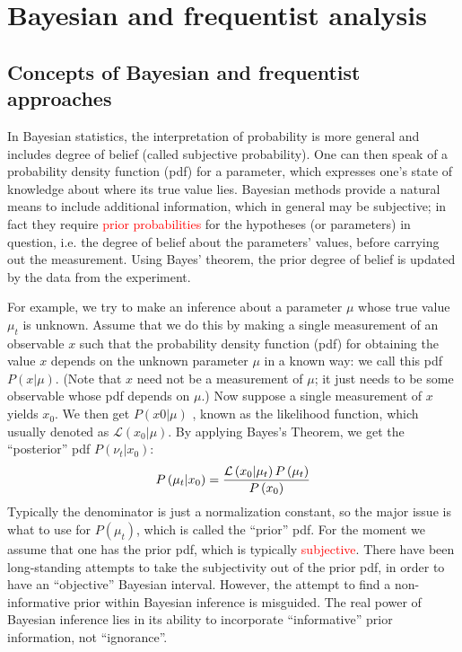 \documentclass[a4paper,12pt]{article}
\begin{document}
\section{Bayesian and frequentist analysis}
\subsection{Concepts of Bayesian and frequentist approaches}
In Bayesian statistics, the interpretation of probability is more
general and includes degree of belief (called subjective probability). One can then speak of a probability density function (pdf)
for a parameter, which expresses one’s state of knowledge about
where its true value lies. Bayesian methods provide a natural
means to include additional information, which in general may be
subjective; in fact they require \textcolor{red}{prior probabilities} for the hypotheses (or parameters) in question, i.e. the degree of belief about the
parameters’ values, before carrying out the measurement. Using
Bayes’ theorem, the prior degree of belief is updated by the data from the experiment.

For example, we try to make an inference about a parameter $\mu$ whose true value $\mu_t$ is unknown. Assume that we do this by making a single measurement of an observable $x$ such that the probability density function (pdf) for obtaining the value $x$ depends on the
unknown parameter $\mu$ in a known way: we call this pdf $P(x|\mu)$. (Note that $x$ need not be a measurement of $\mu$; it just needs to be some observable whose pdf depends on $\mu$.) Now suppose a single measurement of $x$ yields $x_0$. We then get $P(x0|\mu)$ , known as the likelihood function, which usually denoted as $\mathcal{L}(x_0|\mu)$.
By applying  Bayes's Theorem, we get the “posterior” pdf $P(\nu_t|x_0)$:
\begin{equation}
\large
  P\left(\mu_t\vert x_0\right)=\frac{\mathcal L\left(x_0\vert\mu_t\right)P\left(\mu_t\right)}{P\left(x_0\right)}  
\end{equation}
Typically the denominator is just a normalization constant, so the major issue is what to use for $P(\mu_t)$, which is called the “prior” pdf. For the moment we assume that one has the prior pdf,  which is typically \textcolor{red}{subjective}.
There have been long-standing attempts to take the subjectivity out of the prior pdf, in order to have an “objective” Bayesian interval. However, the attempt to find a non-informative prior within Bayesian inference is
misguided. The real power of Bayesian inference lies in its ability to incorporate “informative” prior information, not “ignorance”. 
\end{document}
